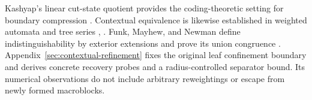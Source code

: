 Kashyap's linear cut-state quotient provides the coding-theoretic setting for
boundary compression \cite[Section~2.4, equation~(1), and Theorem~3.4]{Kashyap2007}.
Contextual equivalence is likewise established in weighted automata and tree
series \cite[Section~6.4, Theorem~8]{Mohri2009}, \cite{Maletti2008}.
Funk, Mayhew, and Newman define indistinguishability by exterior extensions and
prove its union congruence
\cite[Definition~2.2 and Proposition~2.3]{FunkMayhewNewman2019}.
Appendix~\ref{sec:contextual-refinement} fixes the original leaf confinement
boundary and derives concrete recovery probes and a radius-controlled
separator bound.  Its numerical observations do not include arbitrary
reweightings or escape from newly formed macroblocks.
